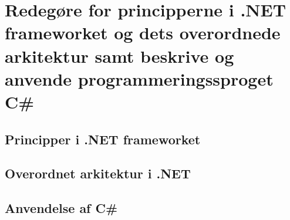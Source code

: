 \section{Redegøre for principperne i .NET frameworket og dets overordnede arkitektur samt beskrive og anvende programmeringssproget C\#}\label{sec:spm1}



\subsection{Principper i .NET frameworket}


\subsection{Overordnet arkitektur i .NET}

\subsection{Anvendelse af C\#}